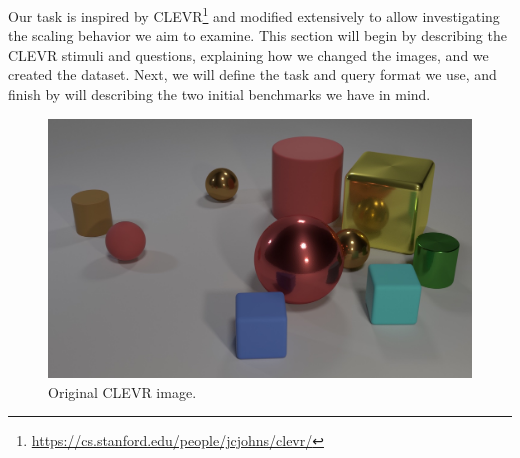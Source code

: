 Our task is inspired by CLEVR\footnote{\url{https://cs.stanford.edu/people/jcjohns/clevr/}} \parencite{Johnson2017} and modified extensively to allow investigating the scaling behavior we aim to examine. This section will begin by describing the CLEVR stimuli and questions, explaining how we changed the images, and we created the dataset. Next, we will define the task and query format we use, and finish by will describing the two initial benchmarks we have in mind.

\begin{figure}
\vspace{-.4in}
\begin{spacing}{1.0}
\centering
\includegraphics[width=.95\linewidth]{ch-dataset-task-benchmark/figures/dataset/original_clevr_image.png}
\caption{Original CLEVR image.}
\label{fig:dataset-clevr-image}
\end{spacing}
\end{figure}

